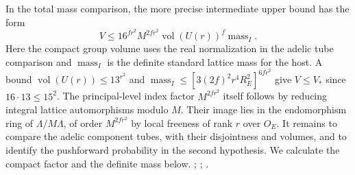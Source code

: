 In the total mass comparison, the more precise intermediate upper
bound has the form
\[
   V\le 16^{fr^2} M^{2fr^2}\operatorname{vol}(U(r))^f
                            \operatorname{mass}_I .
\]
Here the compact group volume uses the real normalization in the
adelic tube comparison and \(\operatorname{mass}_I\) is the
definite standard lattice mass for the host. A bound
\(\operatorname{vol}(U(r))\le13^{r^2}\) and
\(\operatorname{mass}_I\le[3(2f)^2r^4R_E^2]^{6fr^2}\)
give \(V\le V_*\) since \(16\cdot13\le15^2\).
The principal-level index factor \(M^{2fr^2}\) itself follows by
reducing integral lattice automorphisms modulo \(M\). Their image
lies in the endomorphism ring of \(\Lambda/M\Lambda\), of order
\(M^{2fr^2}\) by local freeness of rank \(r\) over \(O_E\).
It remains to compare the adelic component tubes, with their disjointness
and volumes, and to identify the pushforward probability in the second
hypothesis. We calculate the compact factor and the definite mass below.
;
;
.



